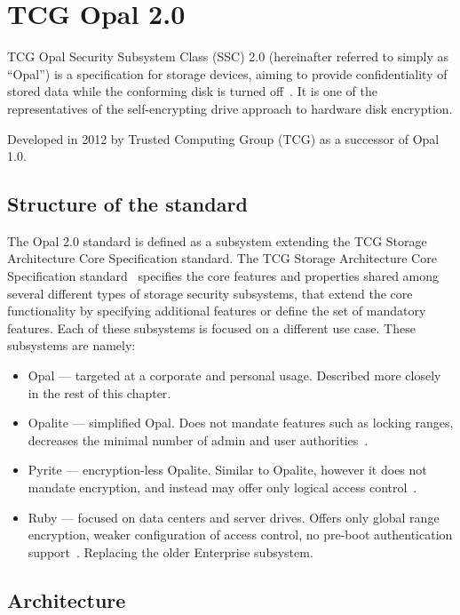 \chapter{TCG Opal 2.0}

TCG Opal Security Subsystem Class (SSC) 2.0 (hereinafter referred to simply as ``Opal'') is a specification for storage devices, aiming to provide confidentiality of stored data while the conforming disk is turned off~\cite{tcg-opal2}. It is one of the representatives of the self-encrypting drive approach to hardware disk encryption.

Developed in 2012 by Trusted Computing Group (TCG) as a successor of Opal 1.0.

\section{Structure of the standard}

The Opal 2.0 standard is defined as a subsystem extending the TCG Storage Architecture Core Specification standard. The TCG Storage Architecture Core Specification standard~\cite{tcg-storage-core} specifies the core features and properties shared among several different types of storage security subsystems, that extend the core functionality by specifying additional features or define the set of mandatory features. Each of these subsystems is focused on a different use case. These subsystems are namely: \begin{itemize}
    \item Opal --- targeted at a corporate and personal usage. Described more closely in the rest of this chapter.
    \item Opalite --- simplified Opal. Does not mandate features such as locking ranges, decreases the minimal number of admin and user authorities~\cite{tcg-opalite}. %
    \item Pyrite --- encryption-less Opalite. Similar to Opalite, however it does not mandate encryption, and instead may offer only logical access control~\cite{tcg-pyrite}.
    \item Ruby --- focused on data centers and server drives. Offers only global range encryption, weaker configuration of access control, no pre-boot authentication support~\cite{tcg-ruby}. Replacing the older Enterprise subsystem.
\end{itemize}

\section{Architecture}

